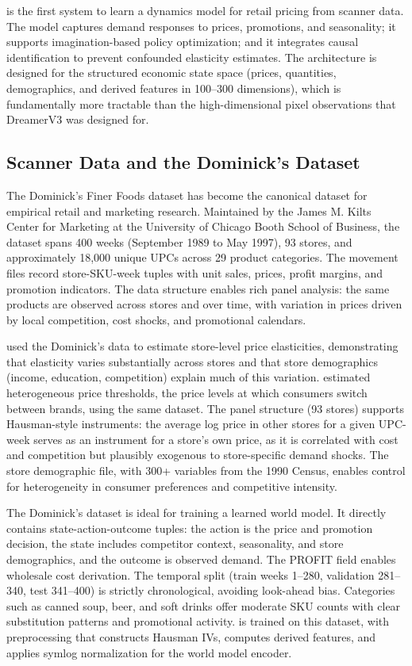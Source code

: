 \dreamprice{} is the first system to learn a dynamics model for retail pricing from scanner data. The model captures demand responses to prices, promotions, and seasonality; it supports imagination-based policy optimization; and it integrates causal identification to prevent confounded elasticity estimates. The architecture is designed for the structured economic state space (prices, quantities, demographics, and derived features in 100--300 dimensions), which is fundamentally more tractable than the high-dimensional pixel observations that DreamerV3 was designed for.

\subsection{Scanner Data and the Dominick's Dataset}

The Dominick's Finer Foods dataset \citep{dominicks1999} has become the canonical dataset for empirical retail and marketing research. Maintained by the James M. Kilts Center for Marketing at the University of Chicago Booth School of Business, the dataset spans 400 weeks (September 1989 to May 1997), 93 stores, and approximately 18,000 unique UPCs across 29 product categories. The movement files record store-SKU-week tuples with unit sales, prices, profit margins, and promotion indicators. The data structure enables rich panel analysis: the same products are observed across stores and over time, with variation in prices driven by local competition, cost shocks, and promotional calendars.

\citet{hoch1995determinants} used the Dominick's data to estimate store-level price elasticities, demonstrating that elasticity varies substantially across stores and that store demographics (income, education, competition) explain much of this variation. \citet{montgomery1997estimating} estimated heterogeneous price thresholds, the price levels at which consumers switch between brands, using the same dataset. The panel structure (93 stores) supports Hausman-style instruments: the average log price in other stores for a given UPC-week serves as an instrument for a store's own price, as it is correlated with cost and competition but plausibly exogenous to store-specific demand shocks. The store demographic file, with 300+ variables from the 1990 Census, enables control for heterogeneity in consumer preferences and competitive intensity.

The Dominick's dataset is ideal for training a learned world model. It directly contains state-action-outcome tuples: the action is the price and promotion decision, the state includes competitor context, seasonality, and store demographics, and the outcome is observed demand. The PROFIT field enables wholesale cost derivation. The temporal split (train weeks 1--280, validation 281--340, test 341--400) is strictly chronological, avoiding look-ahead bias. Categories such as canned soup, beer, and soft drinks offer moderate SKU counts with clear substitution patterns and promotional activity. \dreamprice{} is trained on this dataset, with preprocessing that constructs Hausman IVs, computes derived features, and applies symlog normalization for the world model encoder.
